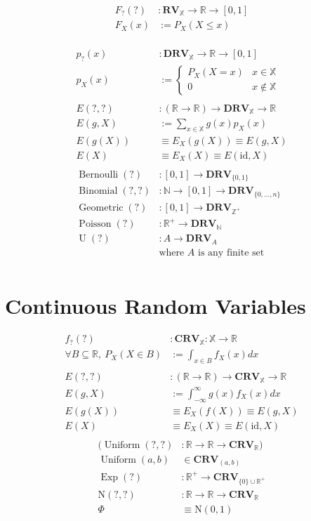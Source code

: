 \documentclass[12pt]{article}
\theoremstyle{definition}
\newcommand{\R}{\mathbb{R}}
\newcommand{\N}{\mathbb{N}}
\newcommand{\X}{\mathbb{X}}
\newcommand{\Z}{\mathbb{Z}}
\newcommand{\RV}{\mathbf{RV}}
\newcommand{\DRV}{\mathbf{DRV}}
\newcommand{\CRV}{\mathbf{CRV}}
\DeclareMathOperator{\Bernoulli}{Bernoulli}
\DeclareMathOperator{\Binomial}{Binomial}
\DeclareMathOperator{\Geometric}{Geometric}
\DeclareMathOperator{\Poisson}{Poisson}
\DeclareMathOperator{\U}{U}
\DeclareMathOperator{\Uniform}{Uniform}
\DeclareMathOperator{\Exp}{Exp}
\begin{document}
\begin{align*}
  F_{?}(?) &: \RV_\X \to \R \to [0, 1]\\
  F_X(x) &:= P_X(X \leq x)\\
\end{align*}

\begin{align*}
  p_{?}(x) &: \DRV_\X \to \R \to [0, 1]\\
  p_X(x) &:= \begin{cases}P_X(X = x) & x \in \X \\ 0 & x \notin \X\end{cases}\\
  \\
  E(?, ?) &: (\R \to \R) \to \DRV_\X \to \R\\
  E(g, X) &:= \sum_{x \in \X}g(x)p_X(x)\\
  E(g(X)) &\equiv E_X(g(X)) \equiv E(g, X)\\
  E(X) &\equiv E_X(X) \equiv E(\text{id}, X)\\
  \\
  \Bernoulli(?) &: [0, 1] \to \DRV_{\{0, 1\}}\\
  \Binomial(?, ?) &: \N \to [0, 1] \to \DRV_{\{0, \ldots, n\}}\\
  \Geometric(?) &: [0, 1] \to \DRV_{\Z^+}\\
  \Poisson(?) &: \R^+ \to \DRV_{\N}\\
  \U(?) &: A \to \DRV_A\\
     &\text{where $A$ is any finite set}\\
\end{align*}

\section{Continuous Random Variables}

\begin{align*}
  f_{?}(?) &: \CRV_\X : \X \to \R\\
  \forall B \subseteq \R,\ P_X(X \in B) &:= \int_{x \in B}f_X(x)dx\\
  \\
  E(?, ?) &: (\R \to \R) \to \CRV_\X \to \R\\
  E(g, X) &:= \int_{-\infty}^{\infty}g(x)f_X(x)dx\\
  E(g(X)) &\equiv E_X(f(X)) \equiv E(g, X)\\
  E(X) &\equiv E_X(X) \equiv E(\text{id}, X)\\
\end{align*}
\begin{align*}
  (\Uniform(?, ?) &: \R \to \R \to \CRV_\R)\\
  \Uniform(a, b) &\in \CRV_{(a, b)}\\
  \Exp(?) &: \R^+ \to \CRV_{\{0\} \cup \R^+}\\
  \text{N}(?, ?) &: \R \to \R \to \CRV_\R\\
  \Phi &\equiv \text{N}(0, 1) 
\end{align*}
\end{document}
